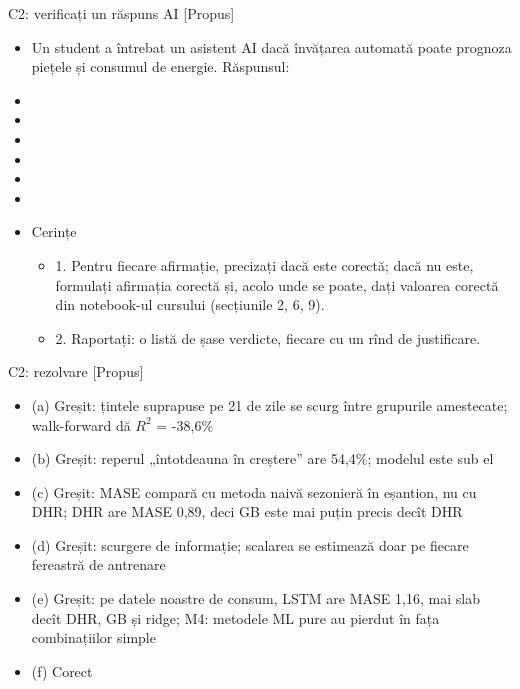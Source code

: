 \begin{frame}{C2: verificați un răspuns AI [Propus]}
\itemsize{\scriptsize}
\begin{itemize}
    \item Un student a întrebat un asistent AI dacă învățarea automată poate prognoza piețele și consumul de energie. Răspunsul:
    \item {}
    \item {}
    \item {}
    \item {}
    \item {}
    \item {}
    \item Cerințe
    \begin{itemize}
        \item 1. Pentru fiecare afirmație, precizați dacă este corectă; dacă nu este, formulați afirmația corectă și, acolo unde se poate, dați valoarea corectă din notebook-ul cursului (secțiunile 2, 6, 9).
        \item 2. Raportați: o listă de șase verdicte, fiecare cu un rînd de justificare.
    \end{itemize}
\end{itemize}
\end{frame}

\ifsolutions
\begin{frame}{C2: rezolvare [Propus]}
\itemsize{\scriptsize}
\begin{itemize}
    \item (a) Greșit: țintele suprapuse pe 21 de zile se scurg între grupurile amestecate; walk-forward dă $R^2$ = -38{,}6\%
    \item (b) Greșit: reperul „întotdeauna în creștere” are 54{,}4\%; modelul este sub el
    \item (c) Greșit: MASE compară cu metoda naivă sezonieră în eșantion, nu cu DHR; DHR are MASE 0{,}89, deci GB este mai puțin precis decît DHR
    \item (d) Greșit: scurgere de informație; scalarea se estimează doar pe fiecare fereastră de antrenare
    \item (e) Greșit: pe datele noastre de consum, LSTM are MASE 1{,}16, mai slab decît DHR, GB și ridge; M4: metodele ML pure au pierdut în fața combinațiilor simple
    \item (f) Corect
\end{itemize}
\end{frame}
\fi


